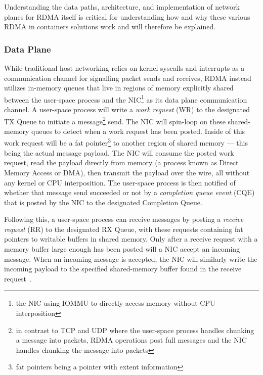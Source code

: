 \documentclass[12pt,titlepage]{article}
\begin{document}
Understanding the data paths, architecture, and implementation of network planes for RDMA itself is critical for understanding how and why these various RDMA in containers solutions work and will therefore be explained.


\subsubsection{Data Plane}
While traditional host networking relies on kernel syscalls and interrupts as a communication channel for signalling packet sends and receives, RDMA instead utilizes in-memory queues that live in regions of memory explicitly shared between the user-space process and the NIC\footnote{the NIC using IOMMU to directly access memory without CPU interposition} as its data plane communication channel.
A user-space process will write a \textit{work request} (WR) to the designated TX Queue to initiate a message\footnote{in contrast to TCP and UDP where the user-space process handles chunking a message into packets, RDMA operations post full messages and the NIC handles chunking the message into packets} send.
The NIC will spin-loop on these shared-memory queues to detect when a work request has been posted.
Inside of this work request will be a fat pointer\footnote{fat pointers being a pointer with extent information} to another region of shared memory --- this being the actual message payload.
The NIC will consume the posted work request, read the payload directly from memory (a process known as Direct Memory Access or DMA), then transmit the payload over the wire, all without any kernel or CPU interposition.
The user-space process is then notified of whether that message send succeeded or not by a \textit{completion queue event} (CQE) that is posted by the NIC to the designated Completion Queue.

Following this, a user-space process can receive messages by posting a \textit{receive request} (RR) to the designated RX Queue, with these requests containing fat pointers to writable buffers in shared memory.
Only after a receive request with a memory buffer large enough has been posted will a NIC accept an incoming message.
When an incoming message is accepted, the NIC will similarly write the incoming payload to the specified shared-memory buffer found in the receive request~\cite{rdmaawareprogramming}.
\end{document}
